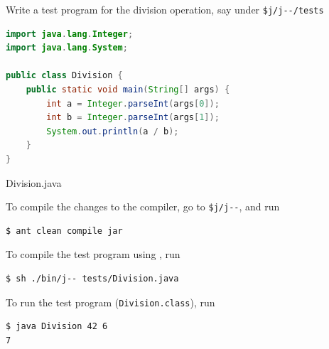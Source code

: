 \documentclass[8pt,a4paper,compress]{beamer}
\begin{document}
\begin{frame}[fragile]
\pause

Write a test program for the division operation, say under \lstinline{$j/j--/tests}

\begin{tcolorbox}[enhanced,drop shadow southwest,sharp corners,size=fbox,colback=white,fontlower=\small\ttfamily,collower=silver900]

\begin{lstlisting}[language=Java,style=focusin]
import java.lang.Integer;
import java.lang.System;

public class Division {
    public static void main(String[] args) {
        int a = Integer.parseInt(args[0]);
        int b = Integer.parseInt(args[1]);
        System.out.println(a / b);
    }
}
\end{lstlisting}

\tcblower
\begin{minipage}[t][.2cm][t]{\textwidth}
Division.java
\end{minipage}
\end{tcolorbox}

\pause\bigskip

To compile the changes to the \jmm compiler, go to \lstinline{$j/j--}, and run

\begin{tcolorbox}[enhanced,drop shadow southwest,sharp corners,size=fbox,colback=black]
\begin{lstlisting}[style=terminal]
$ ant clean compile jar
\end{lstlisting}
\end{tcolorbox}

\pause\bigskip

To compile the test program using \jmm, run

\begin{tcolorbox}[enhanced,drop shadow southwest,sharp corners,size=fbox,colback=black]
\begin{lstlisting}[style=terminal]
$ sh ./bin/j-- tests/Division.java
\end{lstlisting}
\end{tcolorbox}

\pause\bigskip

To run the test program (\lstinline{Division.class}), run

\begin{tcolorbox}[enhanced,drop shadow southwest,sharp corners,size=fbox,colback=black]
\begin{lstlisting}[style=terminal]
$ java Division 42 6
7
\end{lstlisting}
\end{tcolorbox}
\end{frame}
\end{document}
